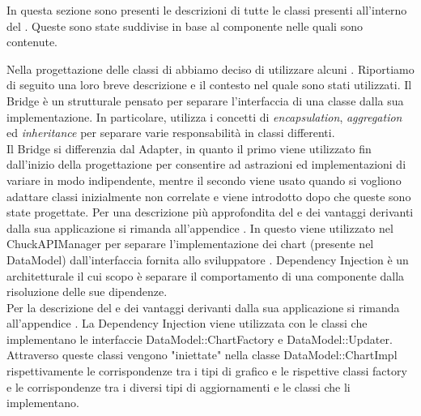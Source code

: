 		In questa sezione sono presenti le descrizioni di tutte le classi presenti all'interno del  . Queste sono state suddivise in base al componente nelle quali sono contenute.
		
		
	
		Nella progettazione delle classi di  abbiamo deciso di utilizzare alcuni . Riportiamo di seguito una loro breve descrizione e il contesto nel quale sono stati utilizzati.
			Il Bridge è un  strutturale pensato per separare l'interfaccia di una classe dalla sua implementazione. In particolare, utilizza i concetti di \textit{encapsulation}, \textit{aggregation} ed \textit{inheritance} per separare varie responsabilità in classi differenti. \\
			Il  Bridge si differenzia dal  Adapter, in quanto il primo viene utilizzato fin dall'inizio della progettazione per consentire ad astrazioni ed implementazioni di variare in modo indipendente, mentre il secondo viene usato quando si vogliono adattare classi inizialmente non correlate e viene introdotto dopo che queste sono state progettate.
			Per una descrizione più approfondita del  e dei vantaggi derivanti dalla sua applicazione si rimanda all'appendice .
				In  questo  viene utilizzato nel  ChuckAPIManager per separare l'implementazione dei chart (presente nel  DataModel) dall'interfaccia fornita allo sviluppatore .
			Dependency Injection è un  architetturale il cui scopo è separare il comportamento di una componente dalla risoluzione delle sue dipendenze.\\
			Per la descrizione del  e dei vantaggi derivanti dalla sua applicazione si rimanda all'appendice .
				La Dependency Injection viene utilizzata con le classi che implementano le interfaccie DataModel::ChartFactory e DataModel::Updater. Attraverso queste classi vengono "iniettate" nella classe DataModel::ChartImpl rispettivamente le corrispondenze tra i tipi di grafico e le rispettive classi factory e le corrispondenze tra i diversi tipi di aggiornamenti e le classi che li implementano.
